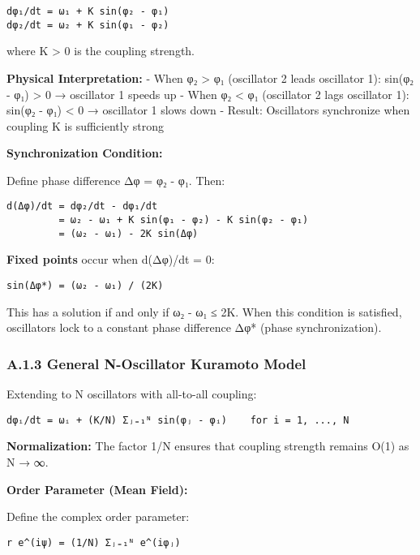 \documentclass[
]{article}
\begin{document}
\begin{verbatim}
dφ₁/dt = ω₁ + K sin(φ₂ - φ₁)
dφ₂/dt = ω₂ + K sin(φ₁ - φ₂)
\end{verbatim}

where K \textgreater{} 0 is the coupling strength.

\textbf{Physical Interpretation:} - When φ₂ \textgreater{} φ₁
(oscillator 2 leads oscillator 1): sin(φ₂ - φ₁) \textgreater{} 0 →
oscillator 1 speeds up - When φ₂ \textless{} φ₁ (oscillator 2 lags
oscillator 1): sin(φ₂ - φ₁) \textless{} 0 → oscillator 1 slows down -
Result: Oscillators synchronize when coupling K is sufficiently strong

\textbf{Synchronization Condition:}

Define phase difference Δφ = φ₂ - φ₁. Then:

\begin{verbatim}
d(Δφ)/dt = dφ₂/dt - dφ₁/dt
         = ω₂ - ω₁ + K sin(φ₁ - φ₂) - K sin(φ₂ - φ₁)
         = (ω₂ - ω₁) - 2K sin(Δφ)
\end{verbatim}

\textbf{Fixed points} occur when d(Δφ)/dt = 0:

\begin{verbatim}
sin(Δφ*) = (ω₂ - ω₁) / (2K)
\end{verbatim}

This has a solution if and only if \textbar ω₂ - ω₁\textbar{} ≤ 2K. When
this condition is satisfied, oscillators lock to a constant phase
difference Δφ* (phase synchronization).

\subsubsection{A.1.3 General N-Oscillator Kuramoto
Model}\label{a.1.3-general-n-oscillator-kuramoto-model}

Extending to N oscillators with all-to-all coupling:

\begin{verbatim}
dφᵢ/dt = ωᵢ + (K/N) Σⱼ₌₁ᴺ sin(φⱼ - φᵢ)    for i = 1, ..., N
\end{verbatim}

\textbf{Normalization:} The factor 1/N ensures that coupling strength
remains O(1) as N → ∞.

\textbf{Order Parameter (Mean Field):}

Define the complex order parameter:

\begin{verbatim}
r e^(iψ) = (1/N) Σⱼ₌₁ᴺ e^(iφⱼ)
\end{verbatim}
\end{document}
